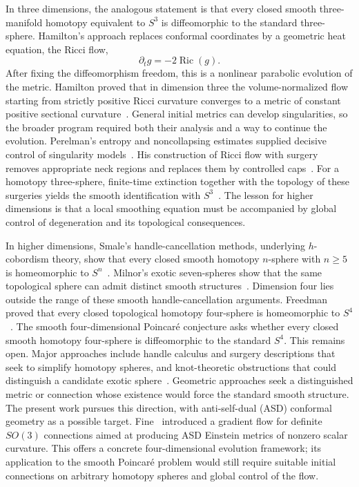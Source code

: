 \documentclass[11pt]{article}
\numberwithin{equation}{section}
\theoremstyle{definition}
\theoremstyle{remark}
\DeclareMathOperator{\Ric}{Ric}
\begin{document}
In three dimensions, the analogous statement is that every closed smooth
three-manifold homotopy equivalent to \(S^3\) is diffeomorphic to the
standard three-sphere. Hamilton's approach replaces conformal coordinates
by a geometric heat equation, the Ricci flow,
\[
 \partial_t g=-2\Ric(g).
\]
After fixing the diffeomorphism freedom, this is a nonlinear parabolic
evolution of the metric. Hamilton proved that in dimension three the
volume-normalized flow starting from strictly positive Ricci curvature
converges to a metric of constant positive sectional
curvature~\cite{Hamilton1982}. General initial metrics can develop
singularities, so the broader program required both their analysis and
a way to continue the evolution. Perelman's entropy and noncollapsing
estimates supplied decisive control of singularity models~\cite{Perelman2002}.
His construction of Ricci flow with surgery removes appropriate neck
regions and replaces them by controlled caps~\cite{Perelman2003Surgery}.
For a homotopy three-sphere, finite-time extinction together with the
topology of these surgeries yields the smooth identification with
\(S^3\)~\cite{Perelman2003Extinction}. The lesson for higher dimensions is
that a local smoothing equation must be accompanied by global control of
degeneration and its topological consequences.

In higher dimensions, Smale's handle-cancellation methods, underlying
$h$-cobordism theory, show that every closed smooth homotopy $n$-sphere
with $n\geq5$ is homeomorphic to $S^n$~\cite{Smale1961}.
Milnor's exotic seven-spheres show that the same topological sphere can
admit distinct smooth structures~\cite{Milnor1956}.
Dimension four lies outside the range of these smooth handle-cancellation
arguments. Freedman proved that every closed topological homotopy
four-sphere is homeomorphic to \(S^4\)~\cite{Freedman1982}. The smooth
four-dimensional Poincar\'e conjecture asks whether every closed smooth
homotopy four-sphere is diffeomorphic to the standard \(S^4\). This remains
open. Major approaches include handle calculus and surgery descriptions
that seek to simplify homotopy
spheres, and knot-theoretic obstructions that could distinguish a candidate
exotic sphere~\cite{FreedmanGompfMorrisonWalker2010}.
Geometric approaches seek a distinguished metric or connection
whose existence would force the standard smooth structure. The present
work pursues this direction, with anti-self-dual (ASD) conformal geometry
as a possible target. Fine~\cite{Fine2011} introduced a gradient flow for
definite \(SO(3)\) connections aimed at producing ASD Einstein metrics of
nonzero scalar curvature. This offers a concrete
four-dimensional evolution framework; its application to the smooth
Poincar\'e problem would still require suitable initial connections on
arbitrary homotopy spheres and global control of the flow.
\end{document}

